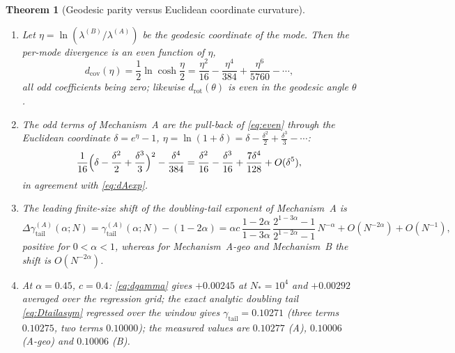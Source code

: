 \documentclass[11pt,reqno]{amsart}
\theoremstyle{plain}
\newtheorem{theorem}{Theorem}[section]
\theoremstyle{definition}
\theoremstyle{remark}
\numberwithin{equation}{section}
\newcommand{\gtail}{\gamma_{\mathrm{tail}}}
\begin{document}
\begin{theorem}[Geodesic parity versus Euclidean coordinate curvature]\label{thm:parity}
\sloppy
\begin{enumerate}[label=\textup{(\arabic*)}]
\item Let $\eta=\ln(\lambda^{(B)}/\lambda^{(A)})$ be the geodesic coordinate of the mode. Then the per-mode divergence is an even function of $\eta$,
\begin{equation}\label{eq:even}
d_{\mathrm{cov}}(\eta)=\frac12\ln\cosh\frac\eta2=\frac{\eta^2}{16}-\frac{\eta^4}{384}+\frac{\eta^6}{5760}-\cdots,
\end{equation}
all odd coefficients being zero; likewise $d_{\mathrm{rot}}(\theta)$ is even in the geodesic angle $\theta$.
\item The odd terms of Mechanism~A are the pull-back of \eqref{eq:even} through the Euclidean coordinate $\delta=e^\eta-1$, $\eta=\ln(1+\delta)=\delta-\frac{\delta^2}2+\frac{\delta^3}3-\cdots$:
\begin{equation}\label{eq:pullback}
\frac1{16}\Bigl(\delta-\frac{\delta^2}2+\frac{\delta^3}3\Bigr)^2-\frac{\delta^4}{384}=\frac{\delta^2}{16}-\frac{\delta^3}{16}+\frac{7\delta^4}{128}+O(\delta^5),
\end{equation}
in agreement with \eqref{eq:dAexp}.
\item The leading finite-size shift of the doubling-tail exponent of Mechanism~A is
\begin{equation}\label{eq:dgamma}
\Delta\gtail^{(A)}(\alpha;N)=\gtail^{(A)}(\alpha;N)-(1-2\alpha)=\alpha c\,\frac{1-2\alpha}{1-3\alpha}\,\frac{2^{1-3\alpha}-1}{2^{1-2\alpha}-1}\,N^{-\alpha}+O(N^{-2\alpha})+O(N^{-1}),
\end{equation}
positive for $0<\alpha<1$, whereas for Mechanism~A-geo and Mechanism~B the shift is $O(N^{-2\alpha})$.
\item At $\alpha=0.45$, $c=0.4$: \eqref{eq:dgamma} gives $+0.00245$ at $N_*=10^4$ and $+0.00292$ averaged over the regression grid; the exact analytic doubling tail \eqref{eq:Dtailasym} regressed over the window gives $\gtail=0.10271$ (three terms $0.10275$, two terms $0.10000$); the measured values are $0.10277$ (A), $0.10006$ (A-geo) and $0.10006$ (B).
\end{enumerate}
\end{theorem}
\end{document}
